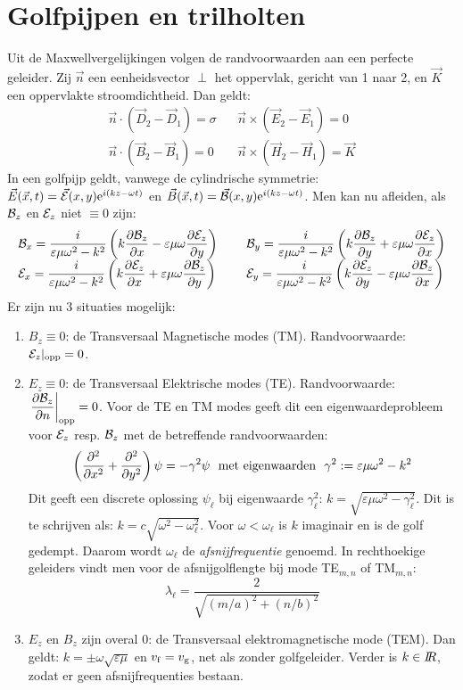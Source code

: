 \section{Golfpijpen en trilholten}
Uit de Maxwellvergelijkingen volgen de randvoorwaarden aan een perfecte
geleider. Zij $\vec{n}$ een eenheidsvector $\perp$ het oppervlak, gericht
van 1 naar 2, en $\vec{K}$ een oppervlakte stroomdichtheid. Dan geldt:
\[
\begin{array}{ll}
\vec{n}\cdot(\vec{D}_2-\vec{D}_1)=\sigma~~&~~\vec{n}\times(\vec{E}_2-\vec{E}_1)=0\\
\vec{n}\cdot(\vec{B}_2-\vec{B}_1)=0~~&~~\vec{n}\times(\vec{H}_2-\vec{H}_1)=\vec{K}
\end{array}
\]
In een golfpijp geldt, vanwege de cylindrische symmetrie:
$\vec{E}(\vec{x},t)=\vec{{\cal E}}(x,y){\rm e}^{i(kz-\omega t)}$ en
$\vec{B}(\vec{x},t)=\vec{{\cal B}}(x,y){\rm e}^{i(kz-\omega t)}$. Men kan
nu afleiden, als ${\cal B}_z$ en ${\cal E}_z$ niet $\equiv0$ zijn:
\[
\begin{array}{ll}
\displaystyle
{\cal B}_x=\frac{i}{\varepsilon\mu\omega^2-k^2}\left(k\frac{\partial {\cal B}_z}{\partial x}-\varepsilon\mu\omega\frac{\partial {\cal E}_z}{\partial y}\right)~~&~~
\displaystyle
{\cal B}_y=\frac{i}{\varepsilon\mu\omega^2-k^2}\left(k\frac{\partial {\cal B}_z}{\partial y}+\varepsilon\mu\omega\frac{\partial {\cal E}_z}{\partial x}\right)\\
\displaystyle
{\cal E}_x=\frac{i}{\varepsilon\mu\omega^2-k^2}\left(k\frac{\partial {\cal E}_z}{\partial x}+\varepsilon\mu\omega\frac{\partial {\cal B}_z}{\partial y}\right)~~&~~
\displaystyle
{\cal E}_y=\frac{i}{\varepsilon\mu\omega^2-k^2}\left(k\frac{\partial {\cal E}_z}{\partial y}-\varepsilon\mu\omega\frac{\partial {\cal B}_z}{\partial x}\right)
\end{array}
\]
Er zijn nu 3 situaties mogelijk:
\begin{enumerate}
\item $B_z\equiv0$: de Transversaal Magnetische modes (TM). Randvoorwaarde:
      ${\cal E}_z|_{\rm opp}=0$.
\item $E_z\equiv0$: de Transversaal Elektrische modes (TE). Randvoorwaarde:
      $\displaystyle\left.\frac{\partial {\cal B}_z}{\partial n}\right|_{\rm opp}=0$.
      \npar
      Voor de TE en TM modes geeft dit een eigenwaardeprobleem voor ${\cal E}_z$
      resp. ${\cal B}_z$ met de betreffende randvoorwaarden:
      \[
      \left(\frac{\partial^2 }{\partial x^2}+\frac{\partial^2 }{\partial y^2}\right)\psi=-\gamma^2\psi~~\mbox{met eigenwaarden}~~
      \gamma^2:=\varepsilon\mu\omega^2-k^2
      \]
      Dit geeft een discrete oplossing $\psi_\ell$ bij eigenwaarde
      $\gamma_\ell^2$: $k=\sqrt{\varepsilon\mu\omega^2-\gamma_\ell^2}$.
      Dit is te schrijven als: $k=c\sqrt{\omega^2-\omega_\ell^2}$. Voor
      $\omega<\omega_\ell$ is $k$ imaginair en is de golf gedempt. Daarom
      wordt $\omega_\ell$ de {\it afsnijfrequentie} genoemd. In rechthoekige
      geleiders vindt men voor de afsnijgolflengte bij mode TE$_{m,n}$ of
      TM$_{m,n}$:
      \[
      \lambda_\ell=\frac{2}{\sqrt{(m/a)^2+(n/b)^2}}
      \]
\item $E_z$ en $B_z$ zijn overal 0: de Transversaal elektromagnetische mode
      (TEM). Dan geldt: $k=\pm\omega\sqrt{\varepsilon\mu}$ en
      $v_{\rm f}=v_{\rm g}$, net als zonder golfgeleider. Verder is $k\in I\hspace{-1mm}R$,
      zodat er geen afsnijfrequenties bestaan.
\end{enumerate}
